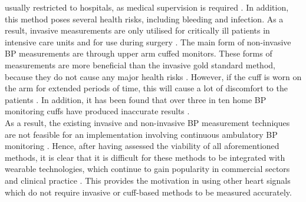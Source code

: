 usually restricted to hospitals, as medical supervision is required \cite{Pradenas2020}. 
In addition, this method poses several health risks, including bleeding and 
infection. As a result, invasive measurements are only utilised for critically 
ill patients in intensive care units and for use during 
surgery \cite{Zaki2018}\cite{ElHajj2020}. The main form of non-invasive BP measurements are through 
upper arm cuffed monitors. These forms of measurements are more beneficial than the invasive gold standard 
method, because they do not cause any major health risks \cite{ElHajj2020}. However, 
if the cuff is worn on the arm for extended periods of time, this will cause a lot of 
discomfort to the patients \cite{Tanveer2018}. In addition, it has been found that over three in ten home BP monitoring 
cuffs have produced inaccurate results \cite{Leung2016}. \\ \newline \noindent  As a 
result, the existing invasive and non-invasive BP measurement techniques are not 
feasible for an implementation involving continuous ambulatory BP 
monitoring \cite{ElHajj2020}. Hence, after having assessed the viability of all 
aforementioned methods, it is clear that it is difficult for these methods to be 
integrated with wearable technologies, which continue to gain popularity in 
commercial sectors and clinical practice \cite{Sharma2017}. This provides the motivation in using 
other heart signals which do not require invasive or cuff-based methods to be measured accurately.

